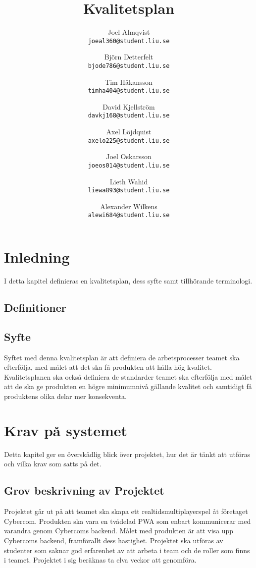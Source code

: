 \documentclass[10pt]{article}
\title{Kvalitetsplan}
\author{
    Joel Almqvist\\
    \texttt{joeal360@student.liu.se}
    \and
    Björn Detterfelt\\
    \texttt{bjode786@student.liu.se}
    \and
    Tim Håkansson\\
    \texttt{timha404@student.liu.se}
    \and
    David Kjellström\\
    \texttt{davkj168@student.liu.se}
    \and
    Axel Löjdquist\\
    \texttt{axelo225@student.liu.se}
    \and
    Joel Oskarsson\\
    \texttt{joeos014@student.liu.se}
    \and
    Lieth Wahid\\
    \texttt{liewa893@student.liu.se}
    \and
    Alexander Wilkens\\
    \texttt{alewi684@student.liu.se}
}
\begin{document}
\maketitle
\pagebreak
\tableofcontents
\pagebreak
\section{Inledning}
	I detta kapitel definieras en kvalitetsplan, dess syfte samt tillhörande terminologi.

	\subsection{Definitioner}
  \begin{itemize}[leftmargin=5cm]
	\end{itemize}	
	
	\subsection{Syfte}
		Syftet med denna kvalitetsplan är att definiera de arbetsprocesser teamet ska efterfölja, med målet att det ska få produkten att hålla hög kvalitet. Kvalitetsplanen ska också definiera de standarder teamet ska efterfölja med målet att de ska ge produkten en högre minimumnivå gällande kvalitet och samtidigt få produktens olika delar mer konsekventa.

		
\pagebreak
\section{Krav på systemet}
	Detta kapitel ger en överskådlig blick över projektet, hur det är tänkt att utföras och vilka krav som satts på det.

	\subsection{Grov beskrivning av Projektet}
	Projektet går ut på att teamet ska skapa ett realtidsmultiplayerspel åt företaget Cybercom. Produkten ska vara en tvådelad PWA som enbart kommunicerar med varandra genom Cybercoms backend. Målet med produkten är att visa upp Cybercoms backend, framförallt dess hastighet.
	Projektet ska utföras av studenter som saknar god erfarenhet av att arbeta i team och de roller som finns i teamet. Projektet i sig beräknas ta elva veckor att genomföra. 
	
\end{document}
